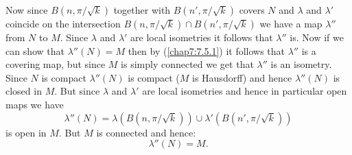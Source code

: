 Now since $B(n,\pi/\sqrt{k})$ together with $B(n',\pi/\sqrt{k})$
covers $N$ and $\lambda$ and $\lambda'$ coincide on the intersection
$B(n,\pi/\sqrt{k})\cap B(n',\pi/\sqrt{k})$ we have a map $\lambda''$
from $N$ to $M$. Since $\lambda$ and $\lambda'$ are local isometries
it follows that $\lambda''$ is. Now if we can show that
$\lambda''(N)=M$ then by (\ref{chap7:7.5.1}) it follows that $\lambda''$
is a covering map, \pageoriginale but since $M$ is simply connected we
get that $\lambda''$ is an isometry. Since $N$ is compact
$\lambda''(N)$ is compact ($M$ is Hausdorff) and hence $\lambda''(N)$
is closed in $M$. But since $\lambda$ and $\lambda'$ are local
isometries and hence in particular open maps we have
$$
\lambda''(N)=\lambda(B(n,\pi/\sqrt{k}))\cup
\lambda'(B(n',\pi/\sqrt{k}))
$$
is open in $M$. But $M$ is connected and hence:
$$
\lambda''(N)=M.
$$

